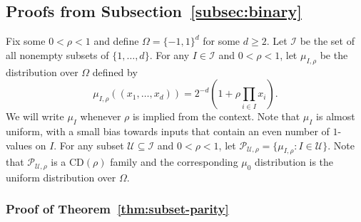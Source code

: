 \documentclass[final, 12pt]{colt2018}
\providecommand{\CD}{\mathrm{CD}}
\newcommand{\subsecref}[1]{Subsection~\ref{#1}}
\begin{document}
\subsection{Proofs from \subsecref{subsec:binary}}

Fix some $0<\rho<1$ and define $\Omega = \{-1,1\}^d$ for some $d \ge 2$. Let $\mathcal{I}$ be the set of all nonempty subsets of $\{1,\dots,d\}$. For any $I \in \mathcal{I}$ and $0 <\rho < 1$, let $\mu_{I,\rho}$ be the distribution over $\Omega$ defined by 
\[
\mu_{I,\rho}((x_1,\dots,x_d)) = 2^{-d} (1 + \rho \prod_{i\in I} x_i).
\]
We will write $\mu_I$ whenever $\rho$ is implied from the context. Note that $\mu_I$ is almost uniform, with a small bias towards inputs that contain an even number of $1$-values on $I$. 
For any subset $\mathcal{U} \subseteq \mathcal{I}$ and $0 < \rho < 1$, let $\mathcal{P}_{\mathcal{U},\rho} = \{ \mu_{I,\rho} \colon I \in \mathcal{U}\}$.
Note that $\mathcal{P}_{\mathcal{U},\rho}$ is a $\CD(\rho)$ family and the corresponding $\mu_0$ distribution is the uniform distribution over $\Omega$. 

\subsubsection{Proof of Theorem~\ref{thm:subset-parity}} \label{sec:pr-subset}
\end{document}
